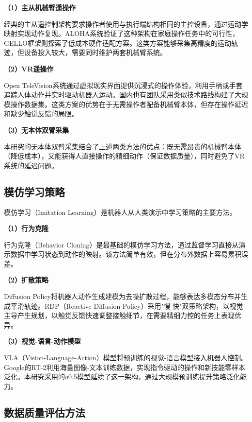 \textbf{（1）主从机械臂遥操作}

经典的主从遥控制架构要求操作者使用与执行端结构相同的主控设备，通过运动学映射实现动作复现。ALOHA系统\cite{zhao2023aloha}验证了这种架构在家庭操作任务中的可行性，GELLO框架\cite{gello2023}则探索了低成本硬件适配方案。这类方案能够采集高精度的运动轨迹，但设备投入较大，需要同时维护两套机械臂系统。

\textbf{（2）VR遥操作}

Open TeleVision系统\cite{cheng2024opentelevision}通过虚拟现实界面提供沉浸式的操作体验，利用手柄或手套追踪人体动作并实时驱动机器人运动。国内也有团队采用类似技术路线构建了大规模操作数据集。这类方案的优势在于无需操作者配备机械臂本体，但存在操作延迟和缺少触觉反馈的局限。

\textbf{（3）无本体双臂采集}

本研究的无本体双臂采集结合了上述两类方法的优点：既无需昂贵的机械臂本体（降低成本），又能获得人直接操作的精细动作（保证数据质量），同时避免了VR系统的延迟问题。

\subsection{模仿学习策略}

模仿学习（Imitation Learning）是机器人从人类演示中学习策略的主要方法。

\textbf{（1）行为克隆}

行为克隆（Behavior Cloning）是最基础的模仿学习方法\cite{argall2009survey,osa2018algorithmic}，通过监督学习直接从演示数据中学习状态到动作的映射。该方法简单有效，但在分布外数据上容易累积误差\cite{osa2018algorithmic}。

\textbf{（2）扩散策略}

Diffusion Policy\cite{chi2023diffusion}将机器人动作生成建模为去噪扩散过程，能够表达多模态分布并生成平滑轨迹。RDP（Reactive Diffusion Policy）\cite{xue2025rdp}采用"慢-快"双策略架构，以视觉主导产生规划，以触觉反馈快速调整接触细节，在需要精细力控的任务上表现优异。

\textbf{（3）视觉-语言-动作模型}

VLA（Vision-Language-Action）模型将预训练的视觉-语言模型接入机器人控制。Google的RT-2\cite{rt22023}利用海量图像-文本训练数据，实现指令驱动的操作和新技能零样本泛化。本研究采用的π0.5模型延续了这一架构，通过大规模预训练提升策略泛化能力。

\subsection{数据质量评估方法}

